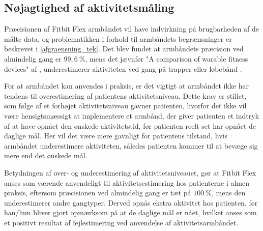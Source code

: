 \subsection{Nøjagtighed af aktivitetsmåling}

Præcisionen af Fitbit Flex armbåndet vil have indvirkning på brugbarheden af de målte data, og problematikken i forhold til armbåndets begrænsninger er beskrevet i \ref{afgraensning_tek}. Det blev fundet at armbåndets præcision ved almindelig gang er $99,6~\%$, mens det jævnfør "A comparison of warable fitness devices" af \citep{kaewkannate2016}, underestimerer aktiviteten ved gang på trapper eller løbebånd \citep{kaewkannate2016}.

For at armbåndet kan anvendes i praksis, er det vigtigt at armbåndet ikke har tendens til overestimering af patientens aktivitetsniveau. Dette krav er stillet, som følge af et forhøjet aktivitetsniveau gavner patienten, hvorfor det ikke vil være hensigtsmæssigt at implementere et armbånd, der giver patienten et indtryk af at have opnået den ønskede aktivitetstid, før patienten reelt set har opnået de daglige mål. Her vil det være mere gavnligt for patientens tilstand, hvis armbåndet underestimere aktiviteten, således patienten kommer til at bevæge sig mere end det ønskede mål.

Betydningen af over- og underestimering af aktivitetsniveauet, gør at Fitbit Flex anses som værende anvendeligt til aktivitetsestimering hos patienterne i almen praksis, eftersom præcisionen ved almindelig gang er tæt på $100~\%$, mens den underestimerer andre gangtyper. Derved opnås ekstra aktivitet hos patienten, før han/hun bliver gjort opmærksom på at de daglige mål er nået, hvilket anses som et positivt resultat af fejlestimering ved anvendelse af aktivitetsarmbåndet.